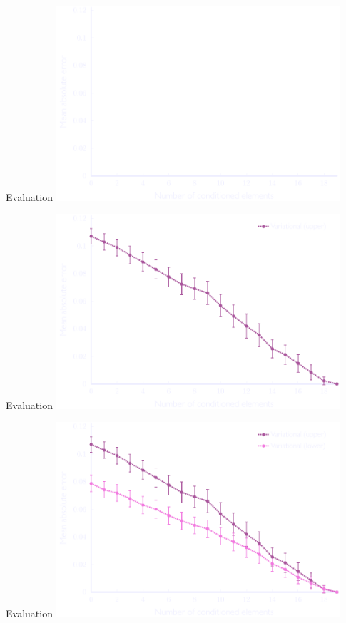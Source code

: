 \documentclass[mathserif]{beamer}
\begin{document}
\begin{frame}{Evaluation}
\vspace{1em}
\centering
\includegraphics[width=4.15in,trim=6 0 0 0,clip]{figures/floc_0.pdf}
\end{frame}

\begin{frame}{Evaluation}
\vspace{1em}
\centering
\includegraphics[width=4.15in,trim=6 0 0 0,clip]{figures/floc_1.pdf}
\end{frame}

\begin{frame}{Evaluation}
\vspace{1em}
\centering
\includegraphics[width=4.15in,trim=6 0 0 0,clip]{figures/floc_2.pdf}
\end{frame}
\end{document}
